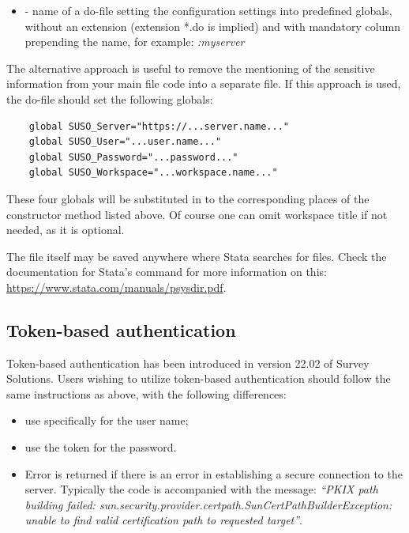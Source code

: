 \paramsheader
\begin{itemize}
\item {} - name of a do-file setting the configuration settings into predefined globals, without an extension (extension *.do is implied) and with mandatory column prepending the name, for example: \textquotedbl\textit{:myserver}\textquotedbl
\end{itemize}

The alternative approach is useful to remove the mentioning of the sensitive information from your main file code into a separate file. If this approach is used, the do-file should set the following globals:
\begin{lstlisting}
    global SUSO_Server="https://...server.name..."
    global SUSO_User="...user.name..."
    global SUSO_Password="...password..."
    global SUSO_Workspace="...workspace.name..."
\end{lstlisting}

These four globals will be substituted in to the corresponding places of the constructor method listed above. Of course one can omit workspace title if not needed, as it is optional.

The file itself may be saved anywhere where Stata searches for files. Check the documentation for Stata's  command for more information on this:\newline
\href{https://www.stata.com/manuals/psysdir.pdf}{https://www.stata.com/manuals/psysdir.pdf}.

\subsection{Token-based authentication}
Token-based authentication has been introduced in version 22.02 of Survey Solutions. Users wishing to utilize token-based authentication should follow the same instructions as above, with the following differences:
\begin{itemize}
  \item use specifically \textquotedbl *\textquotedbl \hspace{0.125cm} for the user name;
  \item use the token for the password.
\end{itemize}

\errheader
\begin{itemize}
    \item Error  is returned if there is an error in establishing a secure connection to the server. Typically the code is accompanied with the message: \textit{``PKIX path building failed: sun.security.provider.certpath.SunCertPathBuilderException: unable to find valid certification path to requested target''}.
\end{itemize}

